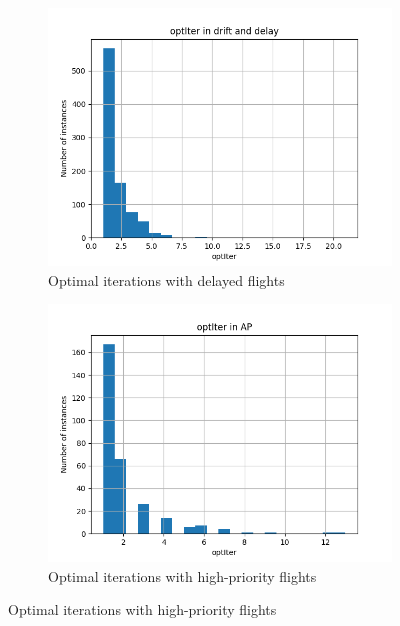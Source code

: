 \documentclass[../../thesis.tex]{subfiles}
\begin{document}
\begin{figure}[ht]
    \centering
    \begin{subfigure}{0.3\textwidth}
        \centering
        \includegraphics[width=\linewidth]{thesis/picture/heuristic/optIter_histogram_DD.png}
        \caption{Optimal iterations with delayed flights}
        \label{fig:heurDD:optIter}
    \end{subfigure}
    \hfill
    \begin{subfigure}{0.3\textwidth}
        \centering
        \includegraphics[width=\linewidth]{thesis/picture/heuristic/optIter_histogram_AP.png}
        \caption{Optimal iterations with high-priority flights}
        \label{fig:heurAP:optIter}
    \end{subfigure}

\end{figure}
\end{document}
